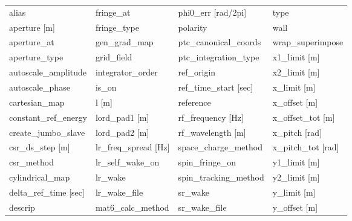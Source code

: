  \begin{tabular}{llll} \toprule
alias                            & fringe_at                        & phi0_err [rad/2pi]               & type                             \\
aperture [m]                     & fringe_type                      & polarity                         & wall                             \\
aperture_at                      & gen_grad_map                     & ptc_canonical_coords             & wrap_superimpose                 \\
aperture_type                    & grid_field                       & ptc_integration_type             & x1_limit [m]                     \\
autoscale_amplitude              & integrator_order                 & ref_origin                       & x2_limit [m]                     \\
autoscale_phase                  & is_on                            & ref_time_start [sec]             & x_limit [m]                      \\
cartesian_map                    & l [m]                            & reference                        & x_offset [m]                     \\
constant_ref_energy              & lord_pad1 [m]                    & rf_frequency [Hz]                & x_offset_tot [m]                 \\
create_jumbo_slave               & lord_pad2 [m]                    & rf_wavelength [m]                & x_pitch [rad]                    \\
csr_ds_step [m]                  & lr_freq_spread [Hz]              & space_charge_method              & x_pitch_tot [rad]                \\
csr_method                       & lr_self_wake_on                  & spin_fringe_on                   & y1_limit [m]                     \\
cylindrical_map                  & lr_wake                          & spin_tracking_method             & y2_limit [m]                     \\
delta_ref_time [sec]             & lr_wake_file                     & sr_wake                          & y_limit [m]                      \\
descrip                          & mat6_calc_method                 & sr_wake_file                     & y_offset [m]                     \\

\end{tabular}
